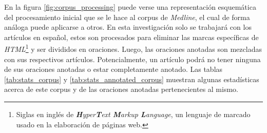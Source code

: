 En la figura \ref{fig:corpus_processing} puede verse una representación esquemática del procesamiento inicial que se le hace al corpus de {\it Medline}, el cual de forma análoga puede aplicarse a otros. En esta investigación solo se trabajará con los artículos en español, estos son procesados para eliminar las marcas específicas de {\it HTML}\footnote{Siglas en inglés de {\it \textbf{H}yper\textbf{T}ext \textbf{M}arkup \textbf{L}anguage}, un lenguaje de marcado usado en la elaboración de páginas web.} y ser divididos en oraciones. Luego, las oraciones anotadas son mezcladas con sus respectivos artículos. Potencialmente, un artículo podrá no tener ninguna de sus oraciones anotadas o estar completamente anotado. Las tablas \ref{tab:stats_corpus} y \ref{tab:stats_annotated_corpus} muestran algunas estadísticas acerca de este corpus y de las oraciones anotadas pertenecientes al mismo.

